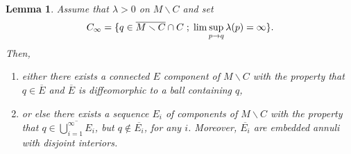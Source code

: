 \documentclass[JEP,XML,SOM,Unicode]{cedram}
\let\moins\smallsetminus
\newcommand{\sep}{\;;\;}
\newtheorem{lemma}[theorem]{Lemma}
\theoremstyle{definition}
\theoremstyle{remark}
\numberwithin{equation}{section}
\begin{document}
\begin{lemma}\label{poles}
Assume that $\lambda >0$ on $M\moins C$ and set
\[C_{\infty}= \{q\in \overline{M\moins C}\cap C\sep \lim\sup_{p\to q}\lambda (p) =\infty\}.\vspace*{-3pt}\]
Then,
\begin{enumerate}
\item either there exists a connected $E$ component of $M\moins C$ with the property that
$q\in\overline{E}$ and $\overline{E}$ is diffeomorphic to a ball containing $q$,
\item or else there exists a sequence $E_i$ of components of $M\moins C$
with the property that $q\in \overline{\bigcup_{i=1}^{\infty} E_i}$, but
$q\not\in \overline{E_i}$, for any $i$. Moreover, $\overline{E_i}$ are embedded annuli with disjoint interiors.
\end{enumerate}
\end{lemma}
\end{document}

